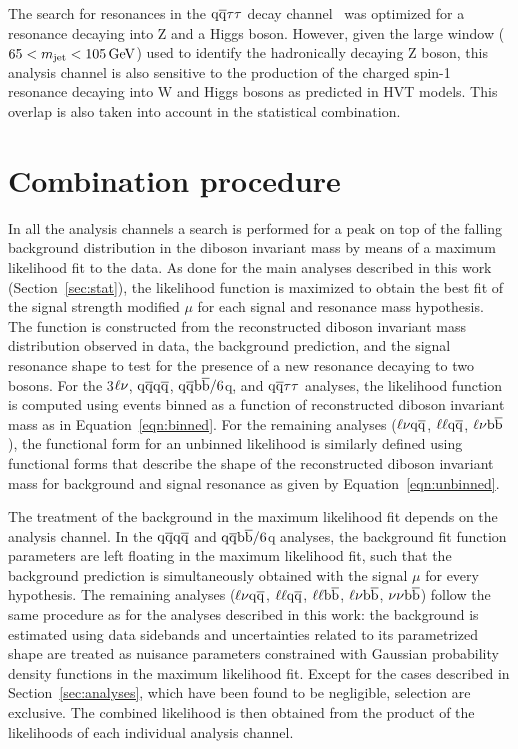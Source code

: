 The search for resonances in the $\mathrm{q}\overline{\mathrm{q}} \tau\tau$ decay channel~\cite{Khachatryan:2015bma} was optimized for a resonance \Zpr decaying into Z and a Higgs boson.
However, given the large \mJ window ($65 <  m_{\text{jet}} < 105\,\text{Ge\hspace{-.08em}V}$) used to identify the hadronically decaying Z boson, this analysis channel is also sensitive to the production of the charged spin-1 \Wpr resonance decaying into W and Higgs bosons as predicted in HVT models. This overlap is also taken into account in the statistical combination.

\section{Combination procedure}\label{sec:combination}

In all the analysis channels a search is performed for a peak on top of the falling background distribution in the diboson invariant mass by means of a maximum likelihood fit to the data.
As done for the main analyses described in this work (Section~\ref{sec:stat}), the likelihood function is maximized to obtain the best fit of the signal strength modified $\mu$ for each signal and resonance mass hypothesis.
The function is constructed from the reconstructed diboson invariant mass distribution observed in data, the background prediction, and the signal resonance shape to test for the presence of a new resonance decaying to two bosons.
For the 3$\ell\nu$, $\mathrm{q}\overline{\mathrm{q}} \mathrm{q}\overline{\mathrm{q}}$, $\mathrm{q}\overline{\mathrm{q}}{\mathrm{b}\overline{\mathrm{b}}}/6$q, and $\mathrm{q}\overline{\mathrm{q}} \tau\tau $ analyses, the likelihood function is computed using events binned as a function of reconstructed diboson invariant mass as in Equation~\ref{eqn:binned}.
For the remaining analyses ($\ell \nu \mathrm{q}\overline{\mathrm{q}}$,  $\ell\ell \mathrm{q}\overline{\mathrm{q}}$, $\ell \nu {\mathrm{b}\overline{\mathrm{b}}}$), the functional form for an unbinned likelihood is similarly defined using functional forms that describe the shape of the reconstructed diboson invariant mass for background and signal resonance as given by Equation~\ref{eqn:unbinned}.

The treatment of the background in the maximum likelihood fit depends on the analysis channel.
In the $\mathrm{q}\overline{\mathrm{q}} \mathrm{q}\overline{\mathrm{q}}$ and $\mathrm{q}\overline{\mathrm{q}}{\mathrm{b}\overline{\mathrm{b}}}/6$q analyses, the background fit function parameters are left floating in the maximum likelihood fit, such that the background prediction is simultaneously obtained with the signal $\mu$ for every hypothesis.
The remaining analyses ($\ell \nu \mathrm{q}\overline{\mathrm{q}}$,  $\ell\ell \mathrm{q}\overline{\mathrm{q}}$, $\ell \ell {\mathrm{b}\overline{\mathrm{b}}}$, $\ell \nu {\mathrm{b}\overline{\mathrm{b}}}$, $\nu \nu {\mathrm{b}\overline{\mathrm{b}}}$) follow the same procedure as for the analyses described in this work: the background is estimated using data sidebands and uncertainties related to its parametrized shape are treated as nuisance parameters constrained with Gaussian probability density functions in the maximum likelihood fit. Except for the cases described in Section~\ref{sec:analyses}, which have been found to be negligible, selection are exclusive. The combined likelihood is then obtained from the product of the likelihoods of each individual analysis channel.

